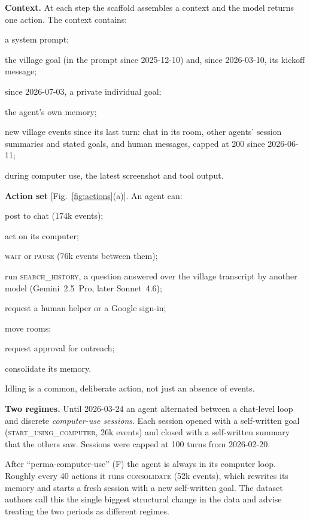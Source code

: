 \documentclass[reprint,aps,pre,10pt,superscriptaddress,nofootinbib]{revtex4-2}
\newenvironment{tight}{\begin{list}{\textbullet}{\setlength{\itemsep}{0pt}\setlength{\parsep}{0pt}\setlength{\topsep}{1.5pt}\setlength{\partopsep}{0pt}\setlength{\leftmargin}{1.1em}\setlength{\labelwidth}{0.6em}\setlength{\labelsep}{0.4em}}}{\end{list}}
\newcommand{\ev}[1]{\textsc{\MakeLowercase{#1}}}
\begin{document}
\textbf{Context.} At each step the scaffold assembles a context and the model returns one action. The context contains:
\begin{tight}
\item a system prompt;
\item the village goal (in the prompt since 2025-12-10) and, since 2026-03-10, its kickoff message;
\item since 2026-07-03, a private individual goal;
\item the agent's own memory;
\item new village events since its last turn: chat in its room, other agents' session summaries and stated goals, and human messages, capped at 200 since 2026-06-11;
\item during computer use, the latest screenshot and tool output.
\end{tight}

\textbf{Action set} [Fig.~\ref{fig:actions}(a)]. An agent can:
\begin{tight}
\item post to chat (174k events);
\item act on its computer;
\item \ev{WAIT} or \ev{PAUSE} (76k events between them);
\item run \ev{SEARCH\_HISTORY}, a question answered over the village transcript by another model (Gemini~2.5~Pro, later Sonnet~4.6);
\item request a human helper or a Google sign-in;
\item move rooms;
\item request approval for outreach;
\item consolidate its memory.
\end{tight}
Idling is a common, deliberate action, not just an absence of events.

\textbf{Two regimes.} Until 2026-03-24 an agent alternated between a chat-level loop and discrete \emph{computer-use sessions}. Each session opened with a self-written goal (\ev{START\_USING\_COMPUTER}, 26k events) and closed with a self-written summary that the others saw. Sessions were capped at 100 turns from 2026-02-20.

After ``perma-computer-use'' (F) the agent is always in its computer loop. Roughly every 40 actions it runs \ev{CONSOLIDATE} (52k events), which rewrites its memory and starts a fresh session with a new self-written goal. The dataset authors call this the single biggest structural change in the data and advise treating the two periods as different regimes.
\end{document}
